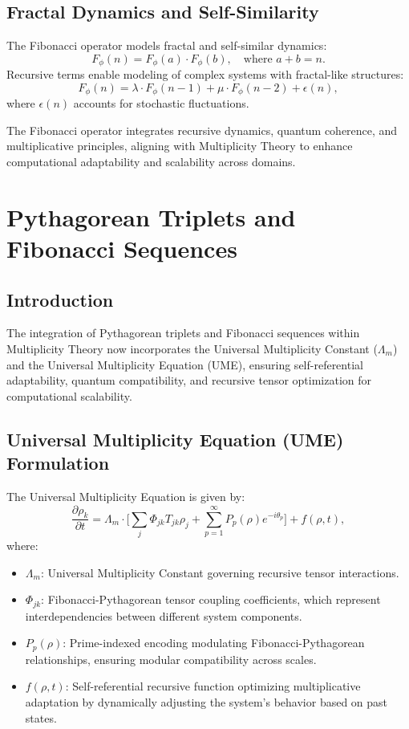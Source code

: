 \documentclass{article}
\theoremstyle{plain}
\begin{document}
\begin{itemize}
\begin{itemize}
\subsection{Fractal Dynamics and Self-Similarity}
The Fibonacci operator models fractal and self-similar dynamics:
\[
F_\phi(n) = F_\phi(a) \cdot F_\phi(b), \quad \text{where } a+b = n.
\]
Recursive terms enable modeling of complex systems with fractal-like structures:
\[
F_\phi(n) = \lambda \cdot F_\phi(n-1) + \mu \cdot F_\phi(n-2) + \epsilon(n),
\]
where \( \epsilon(n) \) accounts for stochastic fluctuations.

The Fibonacci operator integrates recursive dynamics, quantum coherence, and multiplicative principles, aligning with Multiplicity Theory to enhance computational adaptability and scalability across domains.

\section{Pythagorean Triplets and Fibonacci Sequences}

\subsection{Introduction}
The integration of Pythagorean triplets and Fibonacci sequences within Multiplicity Theory now incorporates the Universal Multiplicity Constant ($\Lambda_m$) and the Universal Multiplicity Equation (UME), ensuring self-referential adaptability, quantum compatibility, and recursive tensor optimization for computational scalability.

\subsection{Universal Multiplicity Equation (UME) Formulation}
The Universal Multiplicity Equation is given by:
\begin{equation}
\frac{\partial \rho_k}{\partial t} = \Lambda_m \cdot \bigg[ \sum_{j} \Phi_{jk} T_{jk} \rho_j + \sum_{p=1}^{\infty} P_p(\rho) e^{-i \theta_p} \bigg] + f(\rho, t),
\end{equation}
where:
\begin{itemize}
    \item $\Lambda_m$: Universal Multiplicity Constant governing recursive tensor interactions.
    \item $\Phi_{jk}$: Fibonacci-Pythagorean tensor coupling coefficients, which represent interdependencies between different system components.
    \item $P_p(\rho)$: Prime-indexed encoding modulating Fibonacci-Pythagorean relationships, ensuring modular compatibility across scales.
    \item $f(\rho, t)$: Self-referential recursive function optimizing multiplicative adaptation by dynamically adjusting the system's behavior based on past states.
\end{itemize}


\end{itemize}
\end{itemize}
\end{document}
